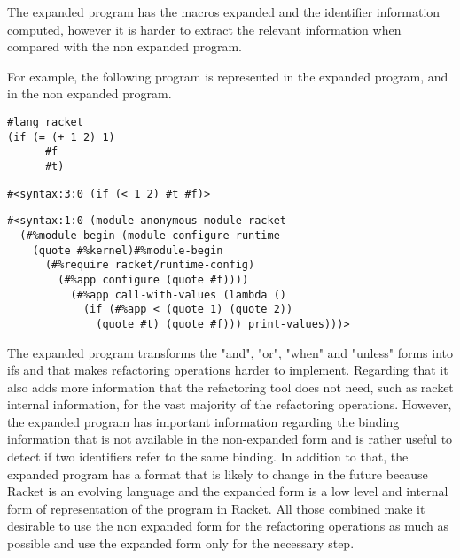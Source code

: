 The expanded program has the macros expanded and the identifier information computed,
however it is harder to extract the relevant information when compared with the
non expanded program.

For example, the following program is represented in the expanded program,
and in the non expanded program.
\begin{lstlisting}[caption="example"]
#lang racket
(if (= (+ 1 2) 1)
      #f
      #t)
\end{lstlisting}

\begin{lstlisting}[caption="Syntax from Example"]
#<syntax:3:0 (if (< 1 2) #t #f)>
\end{lstlisting}

\begin{lstlisting}[caption="Expanded Syntax from example"]
#<syntax:1:0 (module anonymous-module racket
  (#%module-begin (module configure-runtime
    (quote #%kernel)#%module-begin
      (#%require racket/runtime-config)
        (#%app configure (quote #f))))
          (#%app call-with-values (lambda ()
            (if (#%app < (quote 1) (quote 2))
              (quote #t) (quote #f))) print-values)))>
\end{lstlisting}



The expanded program transforms the "and", "or", "when" and "unless" forms into
ifs and that makes refactoring operations harder to implement. Regarding that it
 also adds more information that the refactoring tool does not need, such as racket
 internal information, for the vast majority of the refactoring operations.
However, the expanded program has important information regarding the binding
information that is not available in the non-expanded form and is rather useful
to detect if two identifiers refer to the same binding.
In addition to that, the expanded program has a format that is likely to change
in the future because Racket is an evolving language and the expanded form is a
low level and internal form of representation of the program in Racket.
All those combined make it desirable to use the non expanded form for the refactoring
operations as much as possible and use the expanded form only for the necessary
step.


